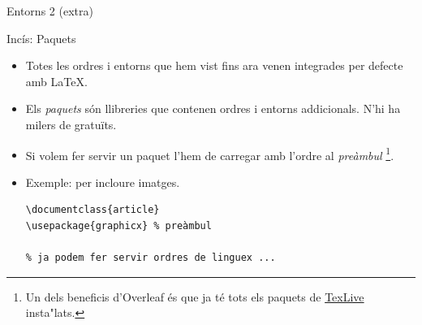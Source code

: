 \begin{frame}[fragile]{Entorns 2 (extra)}
\end{frame}
\begin{frame}[fragile]{Incís: Paquets}

\begin{itemize}
\item Totes les ordres i entorns que hem vist fins ara venen integrades per defecte amb \LaTeX.

\item Els \emph{paquets} són llibreries que contenen ordres i entorns addicionals. N'hi ha milers de gratuïts.

\item Si volem fer servir un paquet l'hem de carregar amb l'ordre 
     al \emph{preàmbul} \footnote{Un dels beneficis d'Overleaf és que ja té tots els paquets de \href{https://tug.org/texlive/}{TexLive} insta"lats.}.

\item Exemple:  per incloure imatges. 
\begin{verbatim}
\documentclass{article}
\usepackage{graphicx} % preàmbul

% ja podem fer servir ordres de linguex ... 

\end{verbatim}
\end{itemize}
\end{frame}

